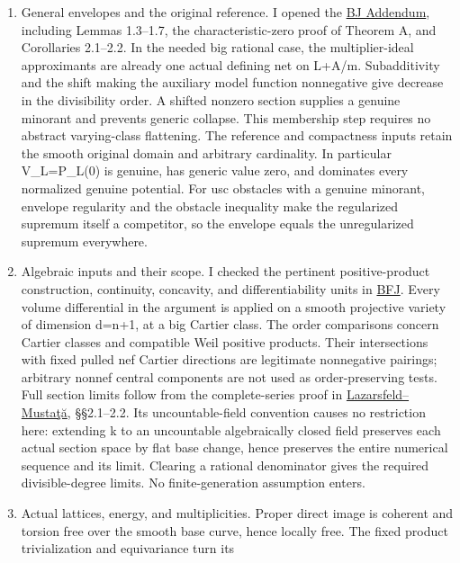 \documentclass[
  10pt,
]{article}
\begin{document}
\begin{enumerate}
\def\labelenumi{\arabic{enumi}.}
\item
  General envelopes and the original reference. I opened the
  \href{https://arxiv.org/pdf/2206.07183v2}{BJ Addendum}, including
  Lemmas 1.3--1.7, the characteristic-zero proof of Theorem A, and
  Corollaries 2.1--2.2. In the needed big rational case, the
  multiplier-ideal approximants are already one actual defining net on
  L+A/m. Subadditivity and the shift making the auxiliary model function
  nonnegative give decrease in the divisibility order. A shifted nonzero
  section supplies a genuine minorant and prevents generic collapse.
  This membership step requires no abstract varying-class flattening.
  The reference and compactness inputs retain the smooth original domain
  and arbitrary cardinality. In particular V\_L=P\_L(0) is genuine, has
  generic value zero, and dominates every normalized genuine potential.
  For usc obstacles with a genuine minorant, envelope regularity and the
  obstacle inequality make the regularized supremum itself a competitor,
  so the envelope equals the unregularized supremum everywhere.
\item
  Algebraic inputs and their scope. I checked the pertinent
  positive-product construction, continuity, concavity, and
  differentiability units in
  \href{https://arxiv.org/pdf/math/0608260v2}{BFJ}. Every volume
  differential in the argument is applied on a smooth projective variety
  of dimension d=n+1, at a big Cartier class. The order comparisons
  concern Cartier classes and compatible Weil positive products. Their
  intersections with fixed pulled nef Cartier directions are legitimate
  nonnegative pairings; arbitrary nonnef central components are not used
  as order-preserving tests. Full section limits follow from the
  complete-series proof in
  \href{https://www.math.stonybrook.edu/robert.lazarsfeld/Reprints/Laz.Mustata.CBALS.pdf}{Lazarsfeld--Mustaţă},
  §§2.1--2.2. Its uncountable-field convention causes no restriction
  here: extending k to an uncountable algebraically closed field
  preserves each actual section space by flat base change, hence
  preserves the entire numerical sequence and its limit. Clearing a
  rational denominator gives the required divisible-degree limits. No
  finite-generation assumption enters.
\item
  Actual lattices, energy, and multiplicities. Proper direct image is
  coherent and torsion free over the smooth base curve, hence locally
  free. The fixed product trivialization and equivariance turn its

\end{enumerate}
\end{document}
